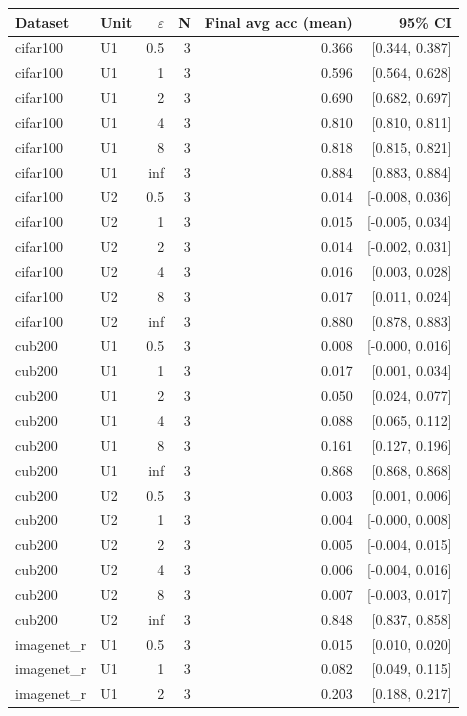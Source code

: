 \begin{tabular}{llrrrr}
\toprule
Dataset & Unit & $\varepsilon$ & N & Final avg acc (mean) & 95\% CI \\
\midrule
cifar100 & U1 & 0.5 & 3 & 0.366 & [0.344, 0.387] \\
cifar100 & U1 & 1 & 3 & 0.596 & [0.564, 0.628] \\
cifar100 & U1 & 2 & 3 & 0.690 & [0.682, 0.697] \\
cifar100 & U1 & 4 & 3 & 0.810 & [0.810, 0.811] \\
cifar100 & U1 & 8 & 3 & 0.818 & [0.815, 0.821] \\
cifar100 & U1 & inf & 3 & 0.884 & [0.883, 0.884] \\
cifar100 & U2 & 0.5 & 3 & 0.014 & [-0.008, 0.036] \\
cifar100 & U2 & 1 & 3 & 0.015 & [-0.005, 0.034] \\
cifar100 & U2 & 2 & 3 & 0.014 & [-0.002, 0.031] \\
cifar100 & U2 & 4 & 3 & 0.016 & [0.003, 0.028] \\
cifar100 & U2 & 8 & 3 & 0.017 & [0.011, 0.024] \\
cifar100 & U2 & inf & 3 & 0.880 & [0.878, 0.883] \\
cub200 & U1 & 0.5 & 3 & 0.008 & [-0.000, 0.016] \\
cub200 & U1 & 1 & 3 & 0.017 & [0.001, 0.034] \\
cub200 & U1 & 2 & 3 & 0.050 & [0.024, 0.077] \\
cub200 & U1 & 4 & 3 & 0.088 & [0.065, 0.112] \\
cub200 & U1 & 8 & 3 & 0.161 & [0.127, 0.196] \\
cub200 & U1 & inf & 3 & 0.868 & [0.868, 0.868] \\
cub200 & U2 & 0.5 & 3 & 0.003 & [0.001, 0.006] \\
cub200 & U2 & 1 & 3 & 0.004 & [-0.000, 0.008] \\
cub200 & U2 & 2 & 3 & 0.005 & [-0.004, 0.015] \\
cub200 & U2 & 4 & 3 & 0.006 & [-0.004, 0.016] \\
cub200 & U2 & 8 & 3 & 0.007 & [-0.003, 0.017] \\
cub200 & U2 & inf & 3 & 0.848 & [0.837, 0.858] \\
imagenet\_r & U1 & 0.5 & 3 & 0.015 & [0.010, 0.020] \\
imagenet\_r & U1 & 1 & 3 & 0.082 & [0.049, 0.115] \\
imagenet\_r & U1 & 2 & 3 & 0.203 & [0.188, 0.217] \\

\end{tabular}
